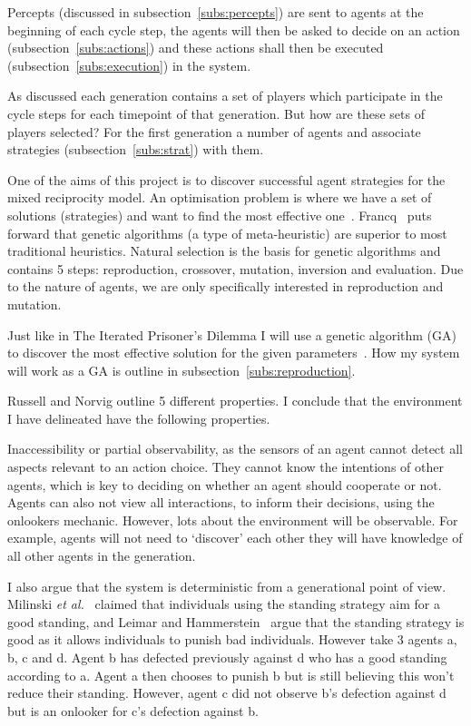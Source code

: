 \documentclass[]{final_report}
\begin{document}
Percepts (discussed in subsection~\ref{subs:percepts}) are sent to agents at the beginning of each cycle step, the agents will then be asked to decide on an action (subsection~\ref{subs:actions}) and these actions shall then be executed (subsection~\ref{subs:execution}) in the system.\par
As discussed each generation contains a set of players which participate in the cycle steps for each timepoint of that generation. But how are these sets of players selected? For the first generation a number of agents and associate strategies (subsection~\ref{subs:strat}) with them.\par
One of the aims of this project is to discover successful agent strategies for the mixed reciprocity model. An optimisation problem is where we have a set of solutions (strategies) and want to find the most effective one~\cite{optimisation_problems}. Francq~\cite{optimisation_problems} puts forward that genetic algorithms (a type of meta-heuristic) are superior to most traditional heuristics. Natural selection is the basis for genetic algorithms and contains 5 steps: reproduction, crossover, mutation, inversion and evaluation. Due to the nature of agents, we are only specifically interested in reproduction and mutation.\par 
Just like in The Iterated Prisoner's Dilemma I will use a genetic algorithm (GA) to discover the most effective solution for the given parameters~\cite{mitchell1998introduction}. How my system will work as a GA is outline in subsection~\ref{subs:reproduction}.\par
Russell and Norvig outline 5 different properties. I conclude that the environment I have delineated have the following properties.\par
Inaccessibility or partial observability, as the sensors of an agent cannot detect all aspects relevant to an action choice. They cannot know the intentions of other agents, which is key to deciding on whether an agent should cooperate or not. Agents can also not view all interactions, to inform their decisions, using the onlookers mechanic. However, lots about the environment will be observable. For example, agents will not need to `discover' each other they will have knowledge of all other agents in the generation.\par
I also argue that the system is deterministic from a generational point of view. Milinski \textit{et al.}~\cite{imagevsstanding} claimed that individuals using the standing strategy aim for a good standing, and Leimar and Hammerstein~\cite{leimarhammer} argue that the standing strategy is good as it allows individuals to punish bad individuals. However take 3 agents a, b, c and d. Agent b has defected previously against d who has a good standing according to a. Agent a then chooses to punish b but is still believing this won't reduce their standing. However, agent c did not observe b's defection against d but is an onlooker for c's defection against b.\par
\end{document}
